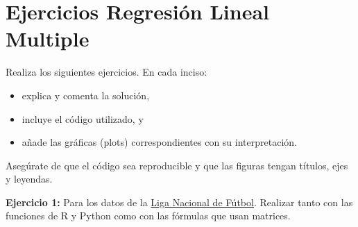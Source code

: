 \documentclass[
]{book}
\begin{document}
\section{Ejercicios Regresión Lineal Multiple}\label{ejercicios-regresiuxf3n-lineal-multiple}

Realiza los siguientes ejercicios. En cada inciso:

\begin{itemize}
\item
  explica y comenta la solución,
\item
  incluye el código utilizado, y
\item
  añade las gráficas (plots) correspondientes con su interpretación.
\end{itemize}

Asegúrate de que el código sea reproducible y que las figuras tengan títulos, ejes y leyendas.

\textbf{Ejercicio 1:} Para los datos de la \href{https://github.com/HaydeePeruyero/MultivariateStatisticalAnalysis/tree/main/data/Liga_nacional_de_futbol.csv}{Liga Nacional de Fútbol}. Realizar tanto con las funciones de R y Python como con las fórmulas que usan matrices.
\end{document}
